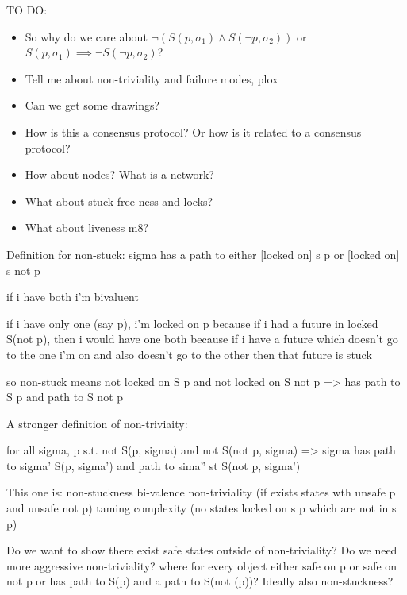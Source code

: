 \documentclass{article}
\theoremstyle{definition}
\begin{document}
TO DO:
\begin{itemize}

\item So why do we care about $\neg(S(p,\sigma_1) \land S(\neg{p},\sigma_2))$ or $S(p,\sigma_1) \implies \neg{S(\neg{p},\sigma_2)}$?

\item Tell me about non-triviality and failure modes, plox

\item Can we get some drawings?

\item How is this a consensus protocol? Or how is it related to a consensus protocol?

\item How about nodes? What is a network?

\item What about stuck-free ness and locks?

\item What about liveness m8?
\end{itemize}


\iffalse

Definition for non-stuck: sigma has a path to either [locked on] s p or [locked on] s not p

if i have both i'm bivaluent

if i have only one (say p), i'm locked on p
  because if i had a future in locked S(not p), then i would have one both
  because if i have a future which doesn't go to the one i'm on and also doesn't go to the other
  then that future is stuck


so non-stuck means not locked on S p and not locked on S not p => has path to S p and path to S not p



A stronger definition of non-triviaity:

for all sigma, p s.t. not S(p, sigma) and not S(not p, sigma) => sigma has path to sigma' S(p, sigma') and path to sima'' st S(not p, sigma')

This one is:
  non-stuckness
  bi-valence
  non-triviality (if exists states wth unsafe p and unsafe not p)
  taming complexity (no states locked on s p which are not in s p)

Do we want to show there exist safe states outside of non-triviality?
Do we need more aggressive non-triviality?
where for every object either safe on p or safe on not p or has path to S(p) and a path to S(not (p))?
Ideally also non-stuckness?
\end{document}
